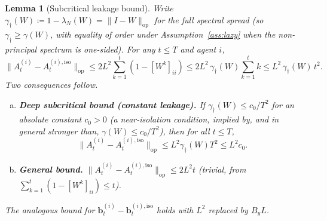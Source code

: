 \documentclass[11pt]{article}
\newtheorem{lemma}[theorem]{Lemma}
\begin{document}
\begin{lemma}[Subcritical leakage bound]\label{lem:leakage}
Write $\gamma_\dagger(W)\coloneqq 1-\lambda_N(W)=\|I-W\|_{\mathrm{op}}$
for the \emph{full} spectral spread (so $\gamma_\dagger\geq\gamma(W)$,
with equality of order under Assumption~\ref{ass:lazy} when the
non-principal spectrum is one-sided).  For any $t\leq T$ and agent $i$,
\begin{equation}
\|A_t^{(i)}-A_t^{(i),\mathrm{iso}}\|_{\mathrm{op}}
\leq 2L^2\sum_{k=1}^t(1-[W^k]_{ii})
\leq 2L^2\,\gamma_\dagger(W)\sum_{k=1}^t k
\leq L^2\,\gamma_\dagger(W)\,t^2.
\label{eq:leakage_exact}
\end{equation}
Two consequences follow.
\begin{enumerate}[(a)]
\item \textbf{Deep subcritical bound (constant leakage).}
If $\gamma_\dagger(W)\leq c_0/T^2$ for an absolute constant $c_0>0$
(a near-isolation condition, implied by, and in general stronger
than, $\gamma(W)\leq c_0/T^2$), then for all $t\leq T$,
\begin{equation}
\|A_t^{(i)}-A_t^{(i),\mathrm{iso}}\|_{\mathrm{op}}
\leq L^2\gamma_\dagger(W)T^2\leq L^2 c_0.
\label{eq:leakage_const}
\end{equation}
\item \textbf{General bound.}
$\|A_t^{(i)}-A_t^{(i),\mathrm{iso}}\|_{\mathrm{op}}\leq 2L^2 t$
(trivial, from $\sum_{k=1}^t(1-[W^k]_{ii})\leq t$).
\end{enumerate}
The analogous bound for $\bm{b}_t^{(i)}-\bm{b}_t^{(i),\mathrm{iso}}$
holds with $L^2$ replaced by $B_y L$.
\end{lemma}
\end{document}
